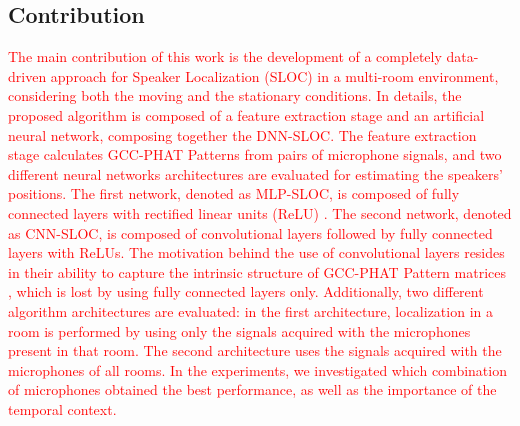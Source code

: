 \documentclass[review]{elsarticle}
\begin{document}
\subsection{Contribution}
\textcolor{red}{
The main contribution of this work is the development of a completely data-driven approach for Speaker Localization (SLOC) in a multi-room environment, considering both the moving and the stationary conditions. %
In details, the proposed algorithm is composed of a feature extraction stage and an artificial neural network, composing together the DNN-SLOC. %
The feature extraction stage calculates GCC-PHAT Patterns \cite{xiao2015learning} from pairs of microphone signals, and two different neural networks architectures are evaluated for estimating the speakers' positions. The first network, denoted as MLP-SLOC, is composed of fully connected layers with rectified linear units (ReLU) \cite{nair2010rectified}. The second network, denoted as CNN-SLOC, is composed of convolutional layers followed by fully connected layers with ReLUs. The motivation behind the use of convolutional layers resides in their ability to capture the intrinsic structure of GCC-PHAT Pattern matrices \cite{xiao2015learning}, which is lost by using fully connected layers only. Additionally, two different algorithm architectures are evaluated: in the first architecture, localization in a room is performed by using only the signals acquired with the microphones present in that room. The second architecture uses the signals acquired with the microphones of all rooms. In the experiments, we investigated which combination of microphones obtained the best performance, as well as the importance of the temporal context.
}

\end{document}
